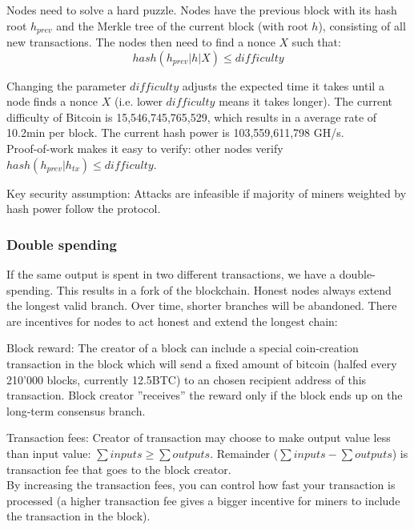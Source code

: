 \documentclass[11pt,oneside,a4paper]{article}
\begin{document}
Nodes need to solve a hard puzzle. Nodes have the previous block with its hash root $h_{prev}$ and the Merkle tree of the current block (with root $h$), consisting of all new transactions. The nodes then need to find a nonce $X$ such that:
$$hash(h_{prev}|h|X) \leq difficulty$$

Changing the parameter $difficulty$ adjusts the expected time it takes until a node finds a nonce $X$ (i.e. lower $difficulty$ means it takes longer). The current difficulty of Bitcoin is 15,546,745,765,529, which results in a average rate of 10.2min per block. The current hash power is 103,559,611,798 GH/s.\\
Proof-of-work makes it easy to verify: other nodes verify $hash(h_{prev}|h_{tx}) \leq difficulty$.

Key security assumption: Attacks are infeasible if majority of miners weighted by hash power follow the protocol.

\subsubsection{Double spending}

If the same output is spent in two different transactions, we have a double-spending. This results in a fork of the blockchain. Honest nodes always extend the longest valid branch. Over time, shorter branches will be abandoned. There are incentives for nodes to act honest and extend the longest chain:

\begin{compactitem}
	\item Block reward: The creator of a block can include a special coin-creation transaction in the block which will send a fixed amount of bitcoin (halfed every 210'000 blocks, currently 12.5BTC) to an chosen recipient address of this transaction. Block creator ”receives” the reward only if the block ends up on the long-term consensus branch.
	\item Transaction fees: Creator of transaction may choose to make output value less than input
	value: $\sum inputs \geq \sum outputs$. Remainder ($\sum inputs - \sum outputs$) is transaction fee that goes to the block creator.\\
	By increasing the transaction fees, you can control how fast your transaction is processed (a higher transaction fee gives a bigger incentive for miners to include the transaction in the block).\\
\end{compactitem}
\end{document}
